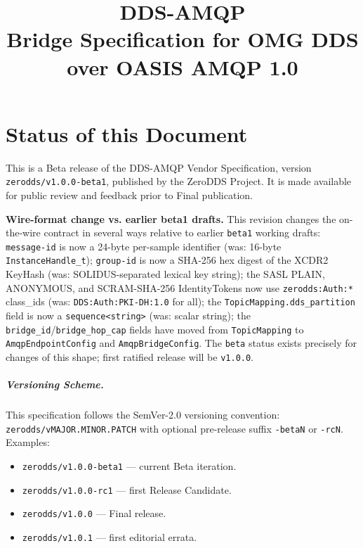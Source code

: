 \documentclass{../styles/zerodds-vendor-spec}
\title{DDS-AMQP\\\large Bridge Specification for OMG DDS over OASIS AMQP 1.0}
\begin{document}
\maketitle

\tableofcontents
\clearpage

\chapter*{Status of this Document}

This is a Beta release of the DDS-AMQP Vendor Specification, version
\texttt{zerodds/v1.0.0-beta1}, published by the ZeroDDS Project. It is
made available for public review and feedback prior to Final
publication.

\begin{specwarning}
\textbf{Wire-format change vs. earlier beta1 drafts.} This
revision changes the on-the-wire contract in several ways
relative to earlier \texttt{beta1} working drafts:
\texttt{message-id} is now a 24-byte per-sample identifier
(was: 16-byte \texttt{InstanceHandle\_t});
\texttt{group-id} is now a SHA-256 hex digest of the XCDR2
KeyHash (was: SOLIDUS-separated lexical key string);
the SASL PLAIN, ANONYMOUS, and SCRAM-SHA-256 IdentityTokens
now use \texttt{zerodds:Auth:*} class\_ids (was:
\texttt{DDS:Auth:PKI-DH:1.0} for all);
the \texttt{TopicMapping.dds\_partition} field is now a
\texttt{sequence<string>} (was: scalar string);
the \texttt{bridge\_id}/\texttt{bridge\_hop\_cap} fields have
moved from \texttt{TopicMapping} to \texttt{AmqpEndpointConfig}
and \texttt{AmqpBridgeConfig}.
The \texttt{beta} status exists precisely for changes of this
shape; first ratified release will be \texttt{v1.0.0}.
\end{specwarning}

\paragraph{Versioning Scheme.}
This specification follows the SemVer-2.0 versioning convention:
\texttt{zerodds/vMAJOR.MINOR.PATCH} with optional pre-release
suffix \texttt{-betaN} or \texttt{-rcN}. Examples:

\begin{itemize}
  \item \texttt{zerodds/v1.0.0-beta1} — current Beta iteration.
  \item \texttt{zerodds/v1.0.0-rc1} — first Release Candidate.
  \item \texttt{zerodds/v1.0.0} — Final release.
  \item \texttt{zerodds/v1.0.1} — first editorial errata.
\end{itemize}
\end{document}
